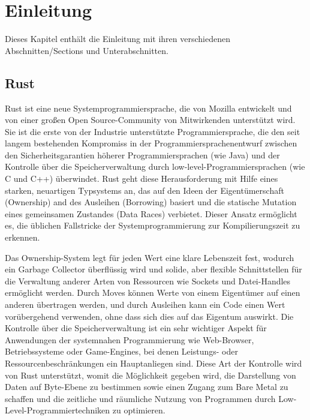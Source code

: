 \chapter{Einleitung}

\nocite{*}

Dieses Kapitel enthält die Einleitung mit ihren verschiedenen Abschnitten/Sections und Unterabschnitten.

\section{Rust}

Rust ist eine neue Systemprogrammiersprache, die von Mozilla entwickelt und von einer großen Open Source-Community von Mitwirkenden unterstützt wird. Sie ist die erste von der Industrie unterstützte Programmiersprache, die den seit langem bestehenden Kompromiss in der Programmiersprachenentwurf zwischen den Sicherheitsgarantien höherer Programmiersprachen (wie Java) und der Kontrolle über die Speicherverwaltung durch low-level-Programmiersprachen (wie C und C++) überwindet. Rust geht diese Herausforderung mit Hilfe eines starken, neuartigen Typsystems an, das auf den Ideen der Eigentümerschaft (Ownership) and des Ausleihen (Borrowing) basiert und die statische Mutation eines gemeinsamen Zustandes (Data Races) verbietet. Dieser Ansatz ermöglicht es, die üblichen Fallstricke der Systemprogrammierung zur Kompilierungszeit zu erkennen. 

Das Ownership-System legt für jeden Wert eine klare Lebenszeit fest, wodurch ein Garbage Collector überflüssig wird und solide, aber flexible Schnittstellen für die Verwaltung anderer Arten von Ressourcen wie Sockets und Datei-Handles ermöglicht werden. Durch \glqq Moves\grqq{} können Werte von einem Eigentümer auf einen anderen übertragen werden, und durch Ausleihen kann ein Code einen Wert vorübergehend verwenden, ohne dass sich dies auf das Eigentum auswirkt. 
Die Kontrolle über die Speicherverwaltung ist ein sehr wichtiger Aspekt für Anwendungen der systemnahen Programmierung wie Web-Browser, Betriebssysteme oder Game-Engines, bei denen Leistungs- oder Ressourcenbeschränkungen ein Hauptanliegen sind. Diese Art der Kontrolle wird von Rust unterstützt, womit die Möglichkeit gegeben wird, die Darstellung von Daten auf Byte-Ebene zu bestimmen sowie einen Zugang zum \glqq Bare Metal\grqq{} zu schaffen und die zeitliche und räumliche Nutzung von Programmen durch Low-Level-Programmiertechniken zu optimieren.

